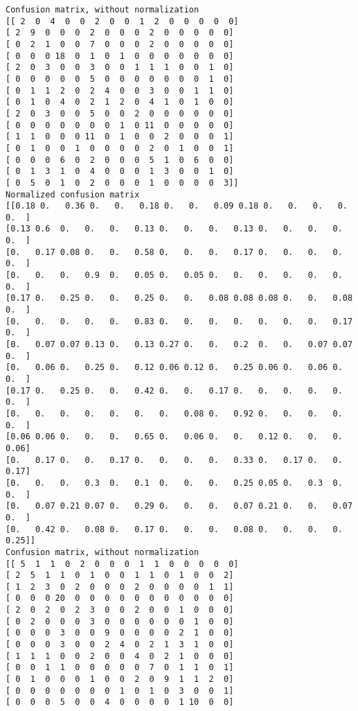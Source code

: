 \documentclass[]{article}
\begin{document}
\begin{verbatim}
Confusion matrix, without normalization
[[ 2  0  4  0  0  2  0  0  1  2  0  0  0  0  0]
[ 2  9  0  0  0  2  0  0  0  2  0  0  0  0  0]
[ 0  2  1  0  0  7  0  0  0  2  0  0  0  0  0]
[ 0  0  0 18  0  1  0  1  0  0  0  0  0  0  0]
[ 2  0  3  0  0  3  0  0  1  1  1  0  0  1  0]
[ 0  0  0  0  0  5  0  0  0  0  0  0  0  1  0]
[ 0  1  1  2  0  2  4  0  0  3  0  0  1  1  0]
[ 0  1  0  4  0  2  1  2  0  4  1  0  1  0  0]
[ 2  0  3  0  0  5  0  0  2  0  0  0  0  0  0]
[ 0  0  0  0  0  0  0  1  0 11  0  0  0  0  0]
[ 1  1  0  0  0 11  0  1  0  0  2  0  0  0  1]
[ 0  1  0  0  1  0  0  0  0  2  0  1  0  0  1]
[ 0  0  0  6  0  2  0  0  0  5  1  0  6  0  0]
[ 0  1  3  1  0  4  0  0  0  1  3  0  0  1  0]
[ 0  5  0  1  0  2  0  0  0  1  0  0  0  0  3]]
Normalized confusion matrix
[[0.18 0.   0.36 0.   0.   0.18 0.   0.   0.09 0.18 0.   0.   0.   0.
0.  ]
[0.13 0.6  0.   0.   0.   0.13 0.   0.   0.   0.13 0.   0.   0.   0.
0.  ]
[0.   0.17 0.08 0.   0.   0.58 0.   0.   0.   0.17 0.   0.   0.   0.
0.  ]
[0.   0.   0.   0.9  0.   0.05 0.   0.05 0.   0.   0.   0.   0.   0.
0.  ]
[0.17 0.   0.25 0.   0.   0.25 0.   0.   0.08 0.08 0.08 0.   0.   0.08
0.  ]
[0.   0.   0.   0.   0.   0.83 0.   0.   0.   0.   0.   0.   0.   0.17
0.  ]
[0.   0.07 0.07 0.13 0.   0.13 0.27 0.   0.   0.2  0.   0.   0.07 0.07
0.  ]
[0.   0.06 0.   0.25 0.   0.12 0.06 0.12 0.   0.25 0.06 0.   0.06 0.
0.  ]
[0.17 0.   0.25 0.   0.   0.42 0.   0.   0.17 0.   0.   0.   0.   0.
0.  ]
[0.   0.   0.   0.   0.   0.   0.   0.08 0.   0.92 0.   0.   0.   0.
0.  ]
[0.06 0.06 0.   0.   0.   0.65 0.   0.06 0.   0.   0.12 0.   0.   0.
0.06]
[0.   0.17 0.   0.   0.17 0.   0.   0.   0.   0.33 0.   0.17 0.   0.
0.17]
[0.   0.   0.   0.3  0.   0.1  0.   0.   0.   0.25 0.05 0.   0.3  0.
0.  ]
[0.   0.07 0.21 0.07 0.   0.29 0.   0.   0.   0.07 0.21 0.   0.   0.07
0.  ]
[0.   0.42 0.   0.08 0.   0.17 0.   0.   0.   0.08 0.   0.   0.   0.
0.25]]
Confusion matrix, without normalization
[[ 5  1  1  0  2  0  0  0  1  1  0  0  0  0  0]
[ 2  5  1  1  0  1  0  0  1  1  0  1  0  0  2]
[ 1  2  3  0  2  0  0  0  2  0  0  0  0  1  1]
[ 0  0  0 20  0  0  0  0  0  0  0  0  0  0  0]
[ 2  0  2  0  2  3  0  0  2  0  0  1  0  0  0]
[ 0  2  0  0  0  3  0  0  0  0  0  0  1  0  0]
[ 0  0  0  3  0  0  9  0  0  0  0  2  1  0  0]
[ 0  0  0  3  0  0  2  4  0  2  1  3  1  0  0]
[ 1  1  1  0  0  2  0  0  4  0  2  1  0  0  0]
[ 0  0  1  1  0  0  0  0  0  7  0  1  1  0  1]
[ 0  1  0  0  0  1  0  0  2  0  9  1  1  2  0]
[ 0  0  0  0  0  0  0  1  0  1  0  3  0  0  1]
[ 0  0  0  5  0  0  4  0  0  0  0  1 10  0  0]

\end{verbatim}
\end{document}
